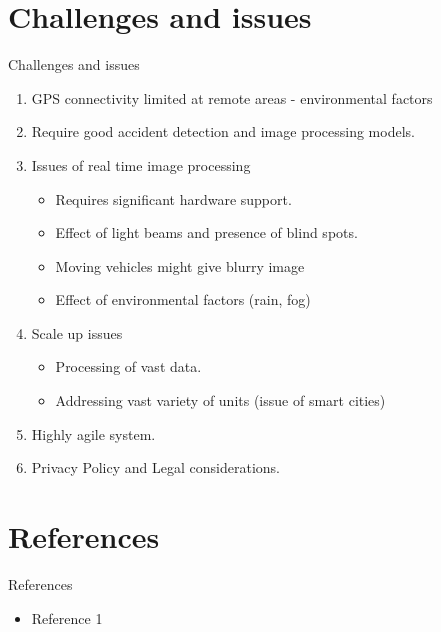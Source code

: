 \documentclass{beamer}
\begin{document}
\section{Challenges and issues}
\begin{frame}{Challenges and issues}
	\begin{enumerate}
	    \item GPS connectivity limited at remote areas - environmental factors
		\item Require good accident detection and image processing models.
		\item Issues of real time image processing
		\begin{itemize}
		    \item Requires significant hardware support.	
		    \item Effect of light beams and presence of blind spots.
			\item Moving vehicles might give blurry image
			\item Effect of environmental factors (rain, fog)
		\end{itemize}
		\item Scale up issues
		\begin{itemize}
			\item Processing of vast data.
			\item Addressing vast variety of units (issue of smart cities)
		\end{itemize}
		\item Highly agile system.
		\item Privacy Policy and Legal considerations.
	\end{enumerate}
\end{frame}

\section{References}
\begin{frame}{References}
    \begin{itemize}
        \item Reference 1
    \end{itemize}
\end{frame}


\end{document}
